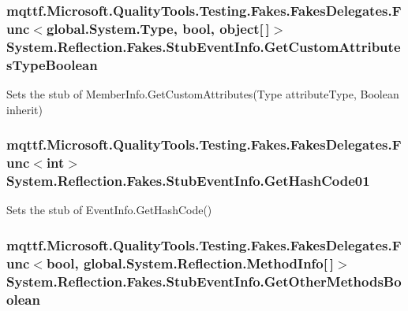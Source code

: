 \hypertarget{class_system_1_1_reflection_1_1_fakes_1_1_stub_event_info_ae9ed04babd2a666e369f54e91fac61d8}{
\subsubsection[{Get\-Custom\-Attributes\-Type\-Boolean}]{\setlength{\rightskip}{0pt plus 5cm}mqttf.\-Microsoft.\-Quality\-Tools.\-Testing.\-Fakes.\-Fakes\-Delegates.\-Func$<$global.\-System.\-Type, bool, object\mbox{[}$\,$\mbox{]}$>$ System.\-Reflection.\-Fakes.\-Stub\-Event\-Info.\-Get\-Custom\-Attributes\-Type\-Boolean}}\label{class_system_1_1_reflection_1_1_fakes_1_1_stub_event_info_ae9ed04babd2a666e369f54e91fac61d8}


Sets the stub of Member\-Info.\-Get\-Custom\-Attributes(\-Type attribute\-Type, Boolean inherit)

\hypertarget{class_system_1_1_reflection_1_1_fakes_1_1_stub_event_info_af5875691404946cb20ac39a138375c63}{
\subsubsection[{Get\-Hash\-Code01}]{\setlength{\rightskip}{0pt plus 5cm}mqttf.\-Microsoft.\-Quality\-Tools.\-Testing.\-Fakes.\-Fakes\-Delegates.\-Func$<$int$>$ System.\-Reflection.\-Fakes.\-Stub\-Event\-Info.\-Get\-Hash\-Code01}}\label{class_system_1_1_reflection_1_1_fakes_1_1_stub_event_info_af5875691404946cb20ac39a138375c63}


Sets the stub of Event\-Info.\-Get\-Hash\-Code()

\hypertarget{class_system_1_1_reflection_1_1_fakes_1_1_stub_event_info_a10c892f5a8ba6459a9fb15c3142b2d52}{
\subsubsection[{Get\-Other\-Methods\-Boolean}]{\setlength{\rightskip}{0pt plus 5cm}mqttf.\-Microsoft.\-Quality\-Tools.\-Testing.\-Fakes.\-Fakes\-Delegates.\-Func$<$bool, global.\-System.\-Reflection.\-Method\-Info\mbox{[}$\,$\mbox{]}$>$ System.\-Reflection.\-Fakes.\-Stub\-Event\-Info.\-Get\-Other\-Methods\-Boolean}}\label{class_system_1_1_reflection_1_1_fakes_1_1_stub_event_info_a10c892f5a8ba6459a9fb15c3142b2d52}


